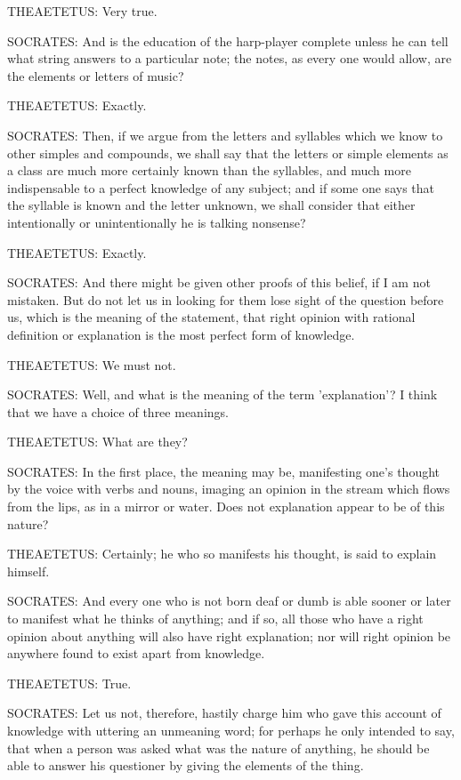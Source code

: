 THEAETETUS: Very true.

SOCRATES: And is the education of the harp-player complete unless he can
tell what string answers to a particular note; the notes, as every one
would allow, are the elements or letters of music?

THEAETETUS: Exactly.

SOCRATES: Then, if we argue from the letters and syllables which we know
to other simples and compounds, we shall say that the letters or simple
elements as a class are much more certainly known than the syllables,
and much more indispensable to a perfect knowledge of any subject; and
if some one says that the syllable is known and the letter unknown,
we shall consider that either intentionally or unintentionally he is
talking nonsense?

THEAETETUS: Exactly.

SOCRATES: And there might be given other proofs of this belief, if I am
not mistaken. But do not let us in looking for them lose sight of the
question before us, which is the meaning of the statement, that right
opinion with rational definition or explanation is the most perfect form
of knowledge.

THEAETETUS: We must not.

SOCRATES: Well, and what is the meaning of the term 'explanation'? I
think that we have a choice of three meanings.

THEAETETUS: What are they?

SOCRATES: In the first place, the meaning may be, manifesting one's
thought by the voice with verbs and nouns, imaging an opinion in the
stream which flows from the lips, as in a mirror or water. Does not
explanation appear to be of this nature?

THEAETETUS: Certainly; he who so manifests his thought, is said to
explain himself.

SOCRATES: And every one who is not born deaf or dumb is able sooner or
later to manifest what he thinks of anything; and if so, all those who
have a right opinion about anything will also have right explanation;
nor will right opinion be anywhere found to exist apart from knowledge.

THEAETETUS: True.

SOCRATES: Let us not, therefore, hastily charge him who gave this
account of knowledge with uttering an unmeaning word; for perhaps he
only intended to say, that when a person was asked what was the nature
of anything, he should be able to answer his questioner by giving the
elements of the thing.

